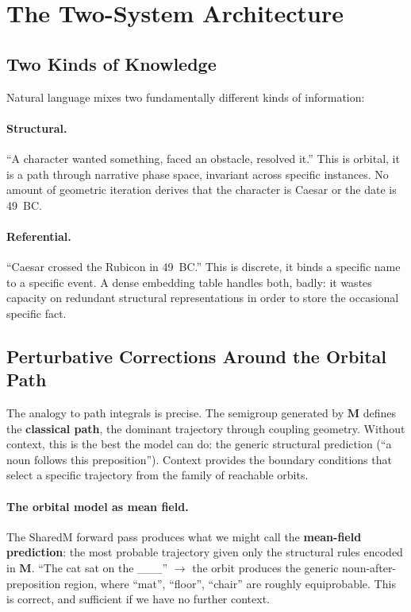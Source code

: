 \documentclass[11pt, a4paper]{article}
\newcommand{\M}{\mathbf{M}}
\theoremstyle{remark}
\begin{document}
\section{The Two-System Architecture}
\label{sec:two-system}

\subsection{Two Kinds of Knowledge}

Natural language mixes two fundamentally different kinds of information:

\paragraph{Structural.}
``A character wanted something, faced an obstacle, resolved it.''
This is orbital, it is a path through narrative phase space, invariant across specific instances.
No amount of geometric iteration derives that the character is Caesar or the date is 49~BC.

\paragraph{Referential.}
``Caesar crossed the Rubicon in 49~BC.''
This is discrete, it binds a specific name to a specific event.
A dense embedding table handles both, badly: it wastes capacity on redundant structural representations in order to store the occasional specific fact.

\subsection{Perturbative Corrections Around the Orbital Path}
\label{sec:perturbative}

The analogy to path integrals is precise.
The semigroup generated by $\M$ defines the \textbf{classical path}, the dominant trajectory through coupling geometry.
Without context, this is the best the model can do: the generic structural prediction (``a noun follows this preposition'').
Context provides the boundary conditions that select a specific trajectory from the family of reachable orbits.

\paragraph{The orbital model as mean field.}
The SharedM forward pass produces what we might call the \textbf{mean-field prediction}: the most probable trajectory given only the structural rules encoded in $\M$.
``The cat sat on the \_\_\_'' $\to$ the orbit produces the generic noun-after-preposition region, where ``mat'', ``floor'', ``chair'' are roughly equiprobable.
This is correct, and sufficient if we have no further context.
\end{document}
